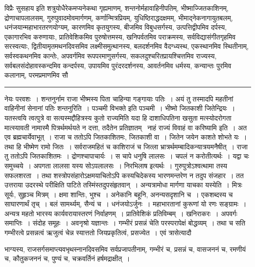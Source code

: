 \documentclass[11pt, openany]{book}
\begin{document}
\newpage

\noindent
विप्रैः सुसहाय इति शत्रुयोधैरेकमप्यनेकथा गृह्यमाणम्, शन्तनोर्महावाहिनीपतिम्, भीष्माज्जितकाशिनम्, द्रोणाचापलालसम्, गुरुपुवादमोवमार्गणम्, कर्णान्मित्रप्रियम्, युधिष्ठिराद्धदक्षमम्, भीमाद्नेकनागायुतबलम्, धनंजयान्महाभारतरणयोग्यम्, कारणमिव कृतयुगस्य, बीजमिव विबुधसर्गस्य, उत्पत्तिद्वीपमिव दर्पस्य, एकागारभिव करुणायाः, प्रातिवेशिकमिव पुरुषोत्तमस्य, खनिपर्वतमिव पराक्रमस्य, सर्वविद्यासंगीतगृहमिव सरस्वत्याः, द्वितीयामृतमथनदिवसमिव लक्ष्मीसमुत्थानस्य, बलदर्शनमिव वैदग्ध्यस्थ, एकस्थानमिव स्थितीनाम्, सर्वस्वकथनमिव कान्तेः, अपवर्गमिव रूपपरमाणुसर्गस्य, सकलदुश्चरितप्रायश्चित्तमिव राज्यस्य, सर्वबलसंदोहावस्कन्दमिव कन्दर्पस्य, उपायमिव पुरंदरदर्शनस्य, आवर्तनमिव धर्मस्य, कन्यान्तः पुरमिव कलानाम्, परमप्रमाणमिव सौ

\vspace{2mm}
\hrule

\noindent
{\s नेयः परवशः~। शन्तनुर्नाम राजा भीष्मस्य पिता चाहिन्या गङ्गायाः पतिः~। अयं तु तस्मादपि महतीनां वाहिनीनां सेनानां पतिः शन्तनुरिति~। {\qt पञ्चमी विभक्ते} इति पञ्चमी~। भीष्मो जितकाशी जितेन्द्रियः~। यतस्त्वयि त्वत्पुत्रे वा सत्यस्मद्दौहित्रस्य कुतो राज्यमिति यदा हि दाशाधिपतिना खसुता मत्स्योदरोगता मात्स्यावती नामास्मै पित्रर्थमर्थयते न दत्ता, तदैतेन प्रतिज्ञातम् \textendash\ {\qt नाहं राज्यं विवाहं वा करिष्यामि} इति~। अत एव ब्रह्मचार्येवाभूत्~। राजा च ततोऽपि जितकाशितमः, जितकाशी वा~। जितेन जयेन काशते शोभते यः~। तथा हि भीष्मेण रामो जितः~। सर्वराजमहितं च काशिराजं च जित्ला भ्रात्रर्थमम्बादिकन्यात्रयमनैषीत्~। राजा तु ततोऽपि जितकाशितमः~। द्रोणश्चापाचार्यः~। स चापे धनुषि लालसः~। चपलं न करोतीत्यर्थः~। यद्वा चः समुच्चये~। अपगता लालसा यस्य सोऽपलालसः~। निरभिलाष इत्यर्थः~। गुरुपुत्रोऽश्वत्थामा तस्य सफलशरता~। तथा शस्त्रोपसंहारोऽक्षमयाचितोऽपि कस्यचिदेकस्य भारणमन्तरेण न तदुप संजहार~। तत उत्तराया उदरस्थे परीक्षिति पाटिते तस्मिंस्तदुपसंहृतवान्~। अन्यत्रामोधा मार्गणा याचका यस्येति~। मित्रः सूर्यः, सुहृञ्च मित्रम्~। क्षमा शान्तिः, भुश्च~। अनेकानि बहूनि, अनन्यसदृशानि च~। एकशब्दस्य च साघारणार्थं तृच्~। बलं सामर्थ्यम्, सैन्यं च~। धनंजयोऽर्जुनः~। महाभारतानां कुरूणां यो रणः सङ्ग्रामः~। अन्यत्र महतो भारस्य कार्यवरायास्तरणं निर्वाहणम्~। प्रातिवेशिकं प्रतिविम्बम्~। खनिराकरः~। अपवर्गः समाप्तिः~। संदोह समूहः~। अवनृश्रो यज्ञान्तः~। गम्भीरं प्रसन्नं चेति परस्परापेक्षं बोद्धव्यम्~। तथा च सति गम्भीरत्वे प्रसन्नत्वं ऋजुत्वं चेन्न स्यात्ततो जियप्रकृतित्वं, प्रसज्येत~। एवं त्रासेत्यादौ}

\newpage

\noindent
भाग्यस्य, राजसर्गसमाप्त्यवभृथस्नानदिवसमिव सर्वप्रजापतीनाम्, गम्भीरं च, प्रसन्नं च, वासजननं च, रमणीयं च, कौतुकजननं च, पुण्यं च, चक्रवर्तिनं हर्षमद्राक्षीत्~।
\end{document}
